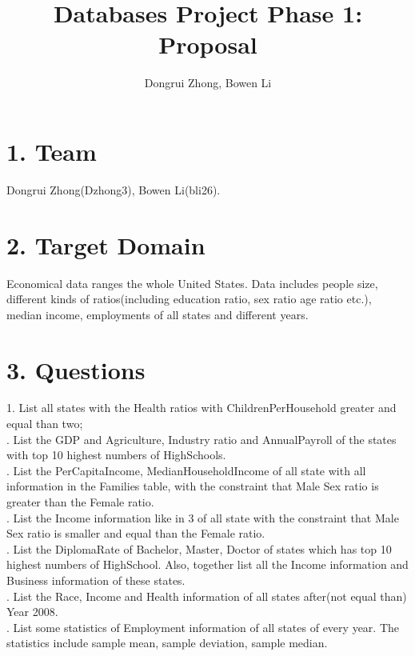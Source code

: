 \documentclass{article}
\author{Dongrui Zhong, Bowen Li}
\title{Databases Project Phase 1: Proposal}
\begin{document}
\maketitle
\section*{1. Team}
Dongrui Zhong(Dzhong3), Bowen Li(bli26).

\section*{2. Target Domain}
Economical data ranges the whole United States. Data includes people size, different kinds of ratios(including education ratio, sex ratio age ratio etc.), median income, employments of all states and different years.

\section*{3. Questions}
1. List all states with the Health ratios with ChildrenPerHousehold greater and equal than two; \\

. List the GDP and Agriculture, Industry ratio and AnnualPayroll of the states with top 10 highest numbers of HighSchools. \\

. List the PerCapitaIncome, MedianHouseholdIncome of all state with all information in the Families table, with the constraint that Male Sex ratio is greater than the Female ratio. \\

. List the Income information like in 3 of all state with the constraint that Male Sex ratio is smaller and equal than the Female ratio. \\

. List the DiplomaRate of Bachelor, Master, Doctor of states which has top 10 highest numbers of HighSchool. Also, together list all the Income information and Business information of these states. \\

. List the Race, Income and Health information of all states after(not equal than) Year 2008. \\

. List some statistics of Employment information of all states of every year. The statistics include sample mean, sample deviation, sample median. \\
\end{document}
